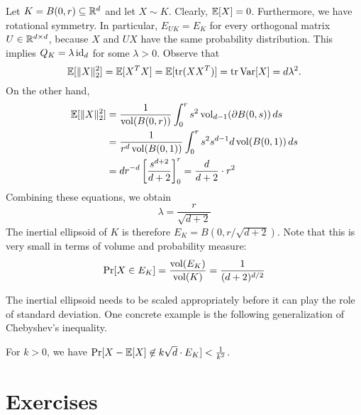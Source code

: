 \begin{example}
  Let $K = B(0,r) \subseteq \mathbb{R}^d$ and let $X \sim K$.
  Clearly, $\mathbb{E}[X] = 0$.
  Furthermore, we have rotational symmetry.
  In particular, $E_{UK} = E_K$ for every orthogonal matrix $U \in \mathbb{R}^{d\times d}$,
  because $X$ and $UX$ have the same probability distribution.
  This implies $Q_K = \lambda \operatorname{id}_d$ for some $\lambda > 0$.
  Observe that
  \[
    \mathbb{E}[ \|X\|_2^2 ] = \mathbb{E}[ X^T X ] = \mathbb{E}[ \operatorname{tr}( X X^T ) ] = \operatorname{tr} \operatorname{Var}[X] = d \lambda^2.
  \]
  On the other hand,
  \begin{align*}
    \mathbb{E}[ \|X\|_2^2 ]
      &= \frac{1}{\operatorname{vol}(B(0,r))} \int_0^r s^2 \operatorname{vol}_{d-1} (\partial B(0,s)) \,ds \\
      &= \frac{1}{r^d \operatorname{vol}(B(0,1))} \int_0^r s^2 s^{d-1} d \operatorname{vol}(B(0,1)) \,ds \\
      &= d r^{-d} \left[ \frac{s^{d+2}}{d+2} \right]_0^r = \frac{d}{d + 2} \cdot r^2
  \end{align*}
  Combining these equations, we obtain
  \[
    \lambda = \frac{r}{\sqrt{d+2}}
  \]
  The inertial ellipsoid of $K$ is therefore $E_K = B(0,r / \sqrt{d+2})$.
  Note that this is very small in terms of volume and probability measure:
  \[
    \Pr[X \in E_K] = \frac{\operatorname{vol}(E_K)}{\operatorname{vol}(K)} = \frac{1}{(d+2)^{d/2}}
  \]
\end{example}

The inertial ellipsoid needs to be scaled appropriately
before it can play the role of standard deviation.
One concrete example is the following generalization of Chebyshev's inequality.

\begin{lemma}
  For $k > 0$, we have $\Pr[ X - \mathbb{E}[X] \not\in k\sqrt{d} \cdot E_K] < \frac{1}{k^2}$.
\end{lemma}






\section*{Exercises}


